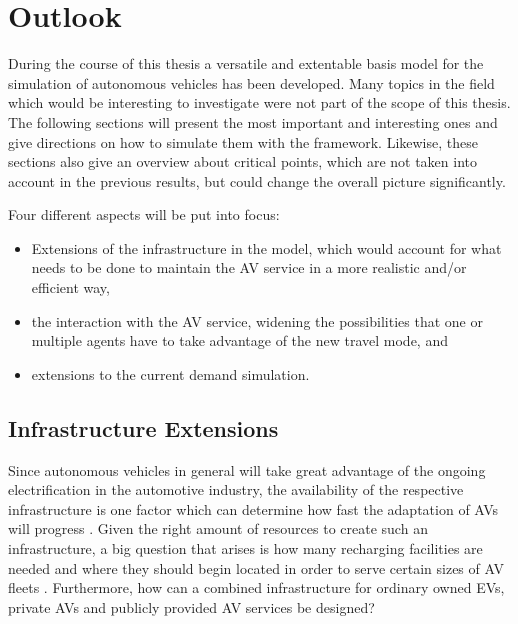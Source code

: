 \section{Outlook}
\label{sec:outlook}

During the course of this thesis a versatile and extentable basis model for the
simulation of autonomous vehicles has been developed. Many topics in the field
which would be interesting to investigate were not part of the scope of this thesis.
The following sections will present the most important and interesting ones and
give directions on how to simulate them with the framework. Likewise, these sections
also give an overview about critical points, which are not taken into account in
the previous results, but could change the overall picture significantly.

Four different aspects will be put into focus:

\begin{itemize}
\item Extensions of the infrastructure
in the model, which would account for what needs to be done to maintain the AV
service in a more realistic and/or efficient way,
\item the interaction with the AV service, widening the possibilities that one
or multiple agents have to take advantage of the new travel mode, and
\item extensions to the current demand simulation.
\end{itemize}

\subsection{Infrastructure Extensions}

Since autonomous vehicles in general will take great advantage of the ongoing
electrification in the automotive industry, the availability of the respective
infrastructure is one factor which can determine how fast the adaptation of AVs
will progress \citep{Burmeister2016}.
Given the right amount of resources to create such an infrastructure, a big question
that arises is how many recharging facilities are needed and where they should begin
located in order to serve certain sizes of AV fleets \citep{Chen2015}. Furthermore, how can a combined
infrastructure for ordinary owned EVs, private AVs and publicly provided AV services
be designed?

